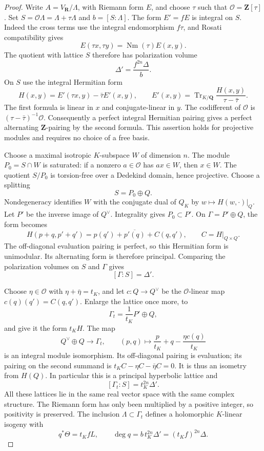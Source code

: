 \documentclass[11pt]{article}
\theoremstyle{definition}
\theoremstyle{remark}
\newcommand{\Q}{\mathbf Q}
\newcommand{\Z}{\mathbf Z}
\newcommand{\R}{\mathbf R}
\begin{document}
\begin{proof}
Write $A=V_{\R}/\Lambda$, with Riemann form $E$, and choose $\tau$ such that $\mathcal O=\Z[\tau]$. Set $S=\mathcal O\Lambda=\Lambda+\tau\Lambda$ and $b=[S:\Lambda]$. The form $E'=fE$ is integral on $S$. Indeed the cross terms use the integral endomorphism $f\tau$, and Rosati compatibility gives
\[
 E(\tau x,\tau y)=\operatorname{Nm}(\tau)E(x,y).
\]
The quotient with lattice $S$ therefore has polarization volume
\[
 \Delta'=\frac{f^{2n}\Delta}{b}.
\]
On $S$ use the integral Hermitian form
\[
 H(x,y)=E'(\tau x,y)-\bar\tau E'(x,y),
 \qquad
 E'(x,y)=\operatorname{Tr}_{K/\Q}
          \frac{H(x,y)}{\tau-\bar\tau}.
\]
The first formula is linear in $x$ and conjugate-linear in $y$. The codifferent of $\mathcal O$ is $(\tau-\bar\tau)^{-1}\mathcal O$. Consequently a perfect integral Hermitian pairing gives a perfect alternating $\Z$-pairing by the second formula. This assertion holds for projective modules and requires no choice of a free basis.

Choose a maximal isotropic $K$-subspace $W$ of dimension $n$. The module $P_0=S\cap W$ is saturated: if a nonzero $a\in\mathcal O$ has $ax\in W$, then $x\in W$. The quotient $S/P_0$ is torsion-free over a Dedekind domain, hence projective. Choose a splitting
\[
 S=P_0\oplus Q.
\]
Nondegeneracy identifies $W$ with the conjugate dual of $Q_K$ by $w\mapsto H(w,\cdot)|_Q$. Let $P'$ be the inverse image of $Q^\vee$. Integrality gives $P_0\subset P'$. On $\Gamma=P'\oplus Q$, the form becomes
\[
 H(p+q,p'+q')=p(q')+\overline{p'(q)}+C(q,q'),
 \qquad C=H|_{Q\times Q}.
\]
The off-diagonal evaluation pairing is perfect, so this Hermitian form is unimodular. Its alternating form is therefore principal. Comparing the polarization volumes on $S$ and $\Gamma$ gives
\[
 [\Gamma:S]=\Delta'.
\]

Choose $\eta\in\mathcal O$ with $\eta+\bar\eta=t_K$, and let $c:Q\to Q^\vee$ be the $\mathcal O$-linear map $c(q)(q')=C(q,q')$. Enlarge the lattice once more, to
\[
 \Gamma_t=\frac1{t_K}P'\oplus Q,
\]
and give it the form $t_KH$. The map
\[
 Q^\vee\oplus Q\longrightarrow\Gamma_t,
 \qquad (p,q)\longmapsto\frac p{t_K}+q-
                                  \frac{\eta c(q)}{t_K}
\]
is an integral module isomorphism. Its off-diagonal pairing is evaluation; its pairing on the second summand is
$t_KC-\eta C-\bar\eta C=0$. It is thus an isometry from $H(Q)$.
In particular this is a principal hyperbolic lattice and
\[
 [\Gamma_t:S]=t_K^{2n}\Delta'.
\]
All these lattices lie in the same real vector space with the same complex structure. The Riemann form has only been multiplied by a positive integer, so positivity is preserved. The inclusion $\Lambda\subset\Gamma_t$ defines a holomorphic $K$-linear isogeny with
\[
 q^*\Theta=t_K fL,
 \qquad \deg q=b\,t_K^{2n}\Delta'=(t_K f)^{2n}\Delta.
\]


\end{proof}
\end{document}
